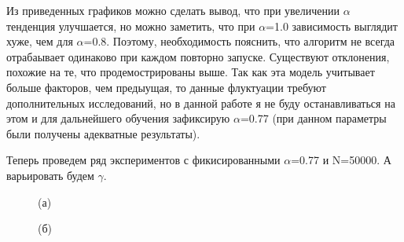 \documentclass[a4paper]{report}
\theoremstyle{definition}
\theoremstyle{plain}
\theoremstyle{remark}
\theoremstyle{remark}
\theoremstyle{definition}
\begin{document}
Из приведенных графиков можно сделать вывод, что при увеличении $\alpha$ тенденция улучшается, но можно заметить, что при $\alpha$=1.0 зависимость выглядит хуже, чем для $\alpha$=0.8. Поэтому, необходимость пояснить, что алгоритм не всегда отрабаывает одинаково при каждом повторно запуске. Существуют отклонения, похожие на те, что продемострированы выше. Так как эта модель учитывает больше факторов, чем предыущая, то данные флуктуации требуют дополнительных исследований, но в данной работе я не буду останавливаться на этом и для дальнейшего обучения зафиксирую $\alpha$=0.77 (при данном параметры были получены адекватные результаты).

Теперь проведем ряд экспериментов с фикисированными $\alpha$=0.77 и N=50000. А варьировать будем $\gamma$.
\begin{figure}[H]
    \begin{minipage}[H]{0.49\linewidth}
        (а)\\
    \end{minipage}
    \hfill
    \begin{minipage}[H]{0.49\linewidth}
        (б)\\

\end{minipage}
\end{figure}
\end{document}
